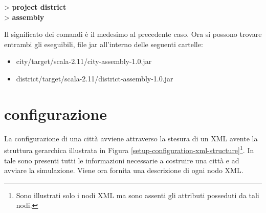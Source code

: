 > \textbf{project district}\\
> \textbf{assembly}

Il significato dei comandi è il medesimo al precedente caso. Ora si possono trovare entrambi gli eseguibili, file \acs{jar} all'interno delle seguenti cartelle:

\begin{itemize}
\item{city/target/scala-2.11/city-assembly-1.0.jar}
\item{district/target/scala-2.11/district-assembly-1.0.jar}
\end{itemize}

\section*{configurazione}
\label{setup-configuration}
La configurazione di una città avviene attraverso la stesura di un  XML avente la struttura gerarchica illustrata in Figura \ref{setup-configuration-xml-structure}\footnote{Sono illustrati solo i nodi XML ma sono assenti gli attributi posseduti da tali nodi.}. In tale  sono presenti tutti le informazioni necessarie a costruire una città e ad avviare la simulazione. Viene ora fornita una descrizione di ogni nodo XML.

